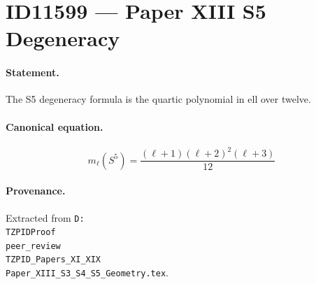 \section*{ID11599 --- Paper XIII S5 Degeneracy}

\paragraph{Statement.}
The S5 degeneracy formula is the quartic polynomial in ell over twelve.

\paragraph{Canonical equation.}
\[
m_\ell(S^5)=\frac{(\ell+1)(\ell+2)^2(\ell+3)}{12}
\]

\paragraph{Provenance.}
Extracted from \texttt{D:\\TZPIDProof\\peer\_review\\TZPID\_Papers\_XI\_XIX\\Paper\_XIII\_S3\_S4\_S5\_Geometry.tex}.
